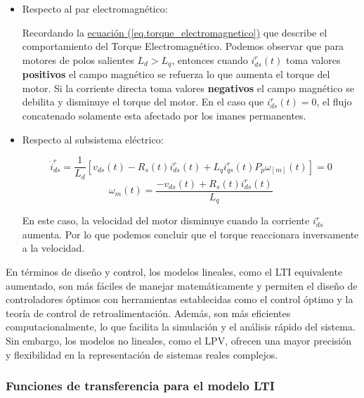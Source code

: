 \documentclass{article}
\begin{document}
\begin{itemize}
    
    \item Respecto al par electromagnético:
    
    Recordando la
    \hyperref[eq.torque_electromagnetico]{ecuación (\ref*{eq.torque_electromagnetico})}
    que describe el comportamiento del Torque Electromagnético.
    Podemos observar que para motores de polos salientes $L_{d} > L_{q}$, entonces cuando $i_{ds}^r(t)$
    toma valores \textbf{positivos} el campo magnético se refuerza lo que aumenta el torque del
    motor. Si la corriente directa toma valores \textbf{negativos} el campo magnético se debilita 
    y disminuye el torque del motor. En el caso que $i_{ds}^r(t) = 0$, el flujo concatenado solamente esta afectado por 
    los imanes permanentes.

    \item Respecto al subsistema eléctrico:

    \begin{equation}
        \dot{i}_{ds}^r = \frac{1}{L_{d}}[v_{ds}(t) - R_{s}(t)i_{ds}^r(t) + L_{q}i_{qs}^r(t)P_{p}\omega_[m](t)] = 0
    \end{equation}
    \begin{equation}
        \omega_{m}(t) = \frac{-v_{ds}(t) + R_{s}(t)i_{ds}^r(t)}{L_{q}}
    \end{equation}

    En este caso, la velocidad del motor disminuye cuando la corriente $i_{ds}^r$ 
    aumenta. Por lo que podemos concluir que el torque reaccionara inversamente 
    a la velocidad.

\end{itemize}

En términos de diseño y control, los modelos lineales, como el LTI equivalente aumentado, son más 
fáciles de manejar matemáticamente y permiten el diseño de controladores óptimos con herramientas 
establecidas como el control óptimo y la teoría de control de retroalimentación. Además, son más 
eficientes computacionalmente, lo que facilita la simulación y el análisis rápido del sistema. Sin 
embargo, los modelos no lineales, como el LPV, ofrecen una mayor precisión y flexibilidad en la 
representación de sistemas reales complejos.


\subsubsection{Funciones de transferencia para el modelo LTI}
\end{document}
